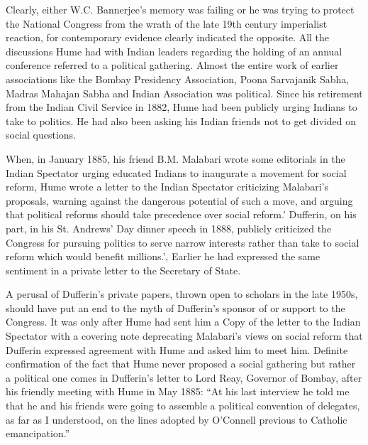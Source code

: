 Clearly, either W.C. Bannerjee's memory was failing or he was trying to protect the National Congress from the wrath of the late 19th century imperialist reaction, for contemporary evidence clearly indicated the opposite. All the discussions Hume had with Indian leaders regarding the holding of an annual conference referred to a political gathering. Almost the entire work of earlier associations like the Bombay Presidency Association, Poona Sarvajanik Sabha, Madras Mahajan Sabha and Indian Association was political. Since his retirement from the Indian Civil Service in 1882, Hume had been publicly urging Indians to take to politics. He had also been asking his Indian friends not to get divided on social questions.

When, in January 1885, his friend B.M. Malabari wrote some editorials in the Indian Spectator urging educated Indians to inaugurate a movement for social reform, Hume wrote a letter to the Indian Spectator criticizing Malabari's proposals, warning against the dangerous potential of such a move, and arguing that political reforms should take precedence over social reform.' Dufferin, on his part, in his St. Andrews' Day dinner speech in 1888, publicly criticized the Congress for pursuing politics to serve narrow interests rather than take to social reform which would benefit millions.', Earlier he had expressed the same sentiment in a private letter to the Secretary of State.

A perusal of Dufferin's private papers, thrown open to scholars in the late 1950s, should have put an end to the myth of Dufferin's sponsor of or support to the Congress. It was only after Hume had sent him a Copy of the letter to the Indian Spectator with a covering note deprecating Malabari's views on social reform that Dufferin expressed agreement with Hume and asked him to meet him. Definite confirmation of the fact that Hume never proposed a social gathering but rather a political one comes in Dufferin's letter to Lord Reay, Governor of Bombay, after his friendly meeting with Hume in May 1885: ``At his last interview he told me that he and his friends were going to assemble a political convention of delegates, as far as I understood, on the lines adopted by O'Connell previous to Catholic emancipation.''

